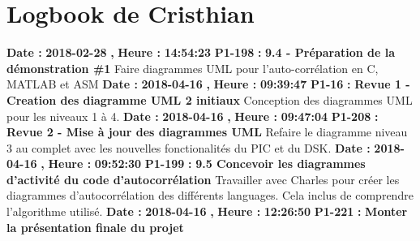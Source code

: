 \documentclass{article}%
\begin{document}
\section{Logbook de Cristhian}%
\textbf{Date : }%
\textbf{2018{-}02{-}28}%
\textbf{,}%
\textbf{ Heure : }%
\textbf{14:54:23}%
\newline%
%
\textbf{P1{-}198 }%
\textbf{ : }%
\textbf{ 9.4 {-} Préparation de la démonstration \#1}%
\newline%
\newline%
%
Faire diagrammes UML pour l'auto{-}corrélation en C, MATLAB et ASM\newline%
\newline%
%
\textbf{Date : }%
\textbf{2018{-}04{-}16}%
\textbf{,}%
\textbf{ Heure : }%
\textbf{09:39:47}%
\newline%
%
\textbf{P1{-}16 }%
\textbf{ : }%
\textbf{ Revue 1 {-} Creation des diagramme UML 2 initiaux}%
\newline%
\newline%
%
Conception des diagrammes UML pour les niveaux 1 à 4.\newline%
\newline%
%
\textbf{Date : }%
\textbf{2018{-}04{-}16}%
\textbf{,}%
\textbf{ Heure : }%
\textbf{09:47:04}%
\newline%
%
\textbf{P1{-}208 }%
\textbf{ : }%
\textbf{ Revue 2 {-} Mise à jour des diagrammes UML}%
\newline%
\newline%
%
Refaire le diagramme niveau 3 au complet avec les nouvelles fonctionalités du PIC et du DSK.\newline%
\newline%
%
\textbf{Date : }%
\textbf{2018{-}04{-}16}%
\textbf{,}%
\textbf{ Heure : }%
\textbf{09:52:30}%
\newline%
%
\textbf{P1{-}199 }%
\textbf{ : }%
\textbf{ 9.5 Concevoir les diagrammes d'activité du code d'autocorrélation}%
\newline%
\newline%
%
Travailler avec Charles pour créer les diagrammes d'autocorrélation des différents languages. Cela inclus de comprendre l'algorithme utilisé.\newline%
\newline%
%
\textbf{Date : }%
\textbf{2018{-}04{-}16}%
\textbf{,}%
\textbf{ Heure : }%
\textbf{12:26:50}%
\newline%
%
\textbf{P1{-}221 }%
\textbf{ : }%
\textbf{ Monter la présentation finale du projet }%
\newline%
\end{document}
